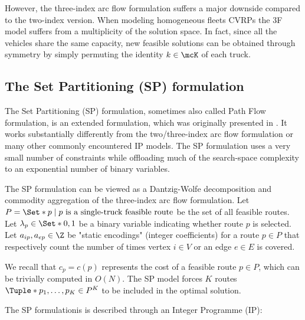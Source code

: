However, the three-index arc flow formulation suffers a major downside compared to the two-index version.
When modeling homogeneous fleets CVRPs the 3F model suffers from a multiplicity of the solution space.
In fact, since all the vehicles share the same capacity,
new feasible solutions can be obtained through symmetry by simply permuting the identity $k \in \mcK$ of each truck.


\subsection{The Set Partitioning (SP) formulation}
\label{sec:intro-set-partition-formulation}

The Set Partitioning (SP) formulation, sometimes also called Path Flow formulation, is an extended formulation, which was originally presented in \textcite{balinski1964}.
It works substantially differently from the two/three-index arc flow formulation or many other commonly encountered IP models.
The SP formulation uses a very small number of constraints while offloading much of the search-space complexity to an exponential number of binary variables.


The SP formulation can be viewed as a Dantzig-Wolfe decomposition \parencite{dantzig1960}
and commodity aggregation \parencite{desaulniers1998}
of the three-index arc flow formulation.
Let $P = \Set*{p \mid p\ \text{is a single-truck feasible route}}$ be the set of all feasible routes.
Let $\lambda_p \in \Set*{0, 1}$ be a binary variable indicating whether route $p$ is selected.
Let $a_{ip}, a_{ep} \in \Z$ be "static encodings" (integer coefficients)
for a route $p \in P$ that respectively count the number of times vertex $i \in V$ or an edge $e \in E$ is covered.

We recall that $c_p = c(p)$ represents the cost of a feasible route $p \in P$, which can be trivially computed in $O(N)$.
The SP model forces $K$ routes $\Tuple*{p_1, \dots, p_K} \in P^K$ to be included in the optimal solution.

The SP formulationis is described through an Integer Programme (IP):


